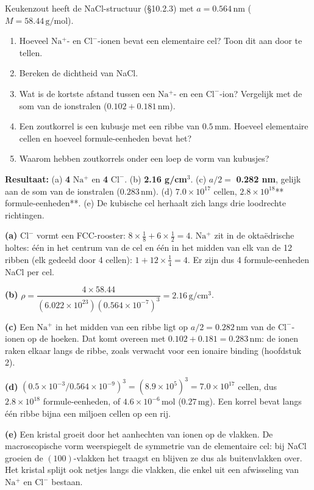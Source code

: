 \begin{oefening}
Keukenzout heeft de NaCl-structuur (§10.2.3) met \(a = 0.564\,\mathrm{nm}\) (\(M = 58.44\,\mathrm{g/mol}\)).

\begin{enumerate}
\item[(a)]
  Hoeveel \(\mathrm{Na^+}\)- en \(\mathrm{Cl^-}\)-ionen bevat een elementaire cel? Toon dit aan door te tellen.
\item[(b)]
  Bereken de dichtheid van NaCl.
\item[(c)]
  Wat is de kortste afstand tussen een \(\mathrm{Na^+}\)- en een \(\mathrm{Cl^-}\)-ion? Vergelijk met de som van de ionstralen (\(0.102 + 0.181\,\mathrm{nm}\)).
\item[(d)]
  Een zoutkorrel is een kubusje met een ribbe van \(0.5\,\mathrm{mm}\). Hoeveel elementaire cellen en hoeveel formule-eenheden bevat het?
\item[(e)]
  Waarom hebben zoutkorrels onder een loep de vorm van kubusjes?
\end{enumerate}
\end{oefening}
\begin{oplossing}
\textbf{Resultaat:} (a) \textbf{4} \(\mathrm{Na^+}\) en \textbf{4} \(\mathrm{Cl^-}\). (b) \textbf{2.16 g/cm\ensuremath{^{3}}}. (c) \(a/2 =\) \textbf{0.282 nm}, gelijk aan de som van de ionstralen (\(0.283\,\mathrm{nm}\)). (d) \(7.0\times10^{17}\) cellen, \textbf{\(2.8\times10^{18}\)}** formule-eenheden**. (e) De kubische cel herhaalt zich langs drie loodrechte richtingen.

\textbf{(a)} \(\mathrm{Cl^-}\) vormt een FCC-rooster: \(8 \times \tfrac{1}{8} + 6 \times \tfrac{1}{2} = 4\). \(\mathrm{Na^+}\) zit in de oktaëdrische holtes: één in het centrum van de cel en één in het midden van elk van de 12 ribben (elk gedeeld door 4 cellen): \(1 + 12 \times \tfrac{1}{4} = 4\). Er zijn dus 4 formule-eenheden NaCl per cel.

\textbf{(b)} \(\rho = \dfrac{4 \times 58.44}{(6.022\times10^{23})(0.564\times10^{-7})^3} = 2.16\,\mathrm{g/cm^3}\).

\textbf{(c)} Een \(\mathrm{Na^+}\) in het midden van een ribbe ligt op \(a/2 = 0.282\,\mathrm{nm}\) van de \(\mathrm{Cl^-}\)-ionen op de hoeken. Dat komt overeen met \(0.102 + 0.181 = 0.283\,\mathrm{nm}\): de ionen raken elkaar langs de ribbe, zoals verwacht voor een ionaire binding (hoofdstuk 2).

\textbf{(d)} \((0.5\times10^{-3}/0.564\times10^{-9})^3 = (8.9\times10^{5})^3 = 7.0\times10^{17}\) cellen, dus \(2.8\times10^{18}\) formule-eenheden, of \(4.6\times10^{-6}\,\mathrm{mol}\) (\(0.27\,\mathrm{mg}\)). Een korrel bevat langs één ribbe bijna een miljoen cellen op een rij.

\textbf{(e)} Een kristal groeit door het aanhechten van ionen op de vlakken. De macroscopische vorm weerspiegelt de symmetrie van de elementaire cel: bij NaCl groeien de \((100)\)-vlakken het traagst en blijven ze dus als buitenvlakken over. Het kristal splijt ook netjes langs die vlakken, die enkel uit een afwisseling van \(\mathrm{Na^+}\) en \(\mathrm{Cl^-}\) bestaan.
\end{oplossing}

